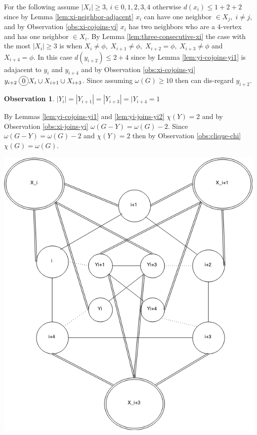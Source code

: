 \documentclass[12pt]{article}
\newcommand*\circled[1]{\tikz[baseline=(char.base)]{
            \node[shape=circle,draw,inner sep=2pt] (char) {#1};}}
\newtheorem{Observation}[Theorem]{Observation}
\begin{document}
For the following assume $|X_i| \geq 3,\, i \in {0,1,2,3,4}$ otherwise $d(x_i) \leq 1 + 2 + 2$ since by Lemma \ref{lem:xi-neighbor-adjacent} $x_i$ can have one neighbor $\in X_j,\; i \neq j $, and by Observation \ref{obs:xi-cojoins-yi} $x_i$ has two neighbors who are a $4$-vertex and has one neighbor $\in X_i$. By Lemma \ref{lem:three-consecutive-xi} the case with the most $|X_i| \geq 3$ is when $X_i \neq \phi,\; X_{i+1} \neq \phi,\; X_{i+2} = \phi,\; X_{i+3} \neq \phi$ and $X_{i+4} = \phi$. In this case $d(y_{i+2}) \leq 2 + 4$ since by Lemma \ref{lem:yi-cojoins-yi1} is adajacent to $y_{i}$ and $y_{i+4}$ and by Observation \ref{obs:xi-cojoins-yi} $y_{i+2} \; \circled{0} X_i \cup X_{i+1} \cup X_{i+3}$. Since assuming $\omega (G) \geq 10$ then can dis-regard $y_{i+2}$.

\begin{Observation}\label{obs:four-yi} 
$|Y_i| = |Y_{i+1}| = |Y_{i+3}| = |Y_{i+4} =  1$
\end{Observation}
\begin{minipage}{0.5\textwidth}%
	 By Lemmas \ref{lem:yi-cojoins-yi1} and \ref{lem:yi-joins-yi2} $\chi (Y) = 2$ and by Observation \ref{obs:xi-joins-yi} $\omega(G - Y) = \omega(G) - 2$. Since $\omega(G - Y) = \omega(G) - 2 $ and $\chi(Y) = 2$ then by Observation \ref{obs:clique-chi} $\chi(G) = \omega(G)$.
\end{minipage}
\hfill
\begin{minipage}{0.5\textwidth}\raggedleft
	\includegraphics[width=\linewidth]{Base.png}
\end{minipage}
\clearpage
\end{document}
